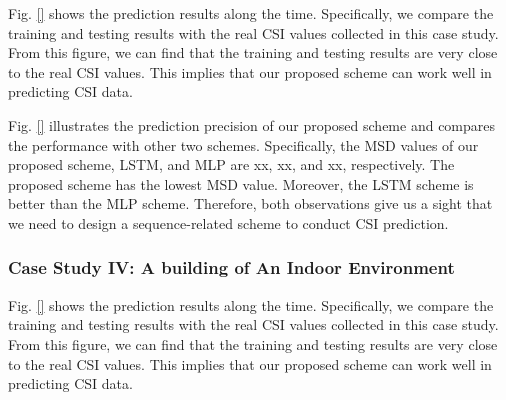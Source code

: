 \documentclass[10pt,journal,cspaper,compsoc]{IEEEtran}
\begin{document}
Fig. \ref{} shows the prediction results along the time. Specifically, we compare the training and testing results with the real CSI values collected in this case study. From this figure, we can find that the training and testing results are very close to the real CSI values. This implies that our proposed scheme can work well in predicting CSI data.


Fig. \ref{} illustrates the prediction precision of our proposed scheme and compares the performance with other two schemes. Specifically, the MSD values of our proposed scheme, LSTM, and MLP are xx, xx, and xx, respectively. The proposed scheme has the lowest MSD value. Moreover, the LSTM scheme is better than the MLP scheme. Therefore, both observations give us a sight that we need to design a sequence-related scheme to conduct CSI prediction.








\subsubsection{Case Study IV: A building of An Indoor Environment}
\label{subsec:case4}


Fig. \ref{} shows the prediction results along the time. Specifically, we compare the training and testing results with the real CSI values collected in this case study. From this figure, we can find that the training and testing results are very close to the real CSI values. This implies that our proposed scheme can work well in predicting CSI data.
\end{document}
